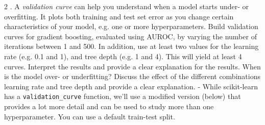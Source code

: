\documentclass[11pt]{article}
\begin{document}
    2 . A \emph{validation curve} can help you understand when a model
starts under- or overfitting. It plots both training and test set error
as you change certain characteristics of your model, e.g. one or more
hyperparameters. Build validation curves for gradient boosting,
evaluated using AUROC, by varying the number of iterations between 1 and
500. In addition, use at least two values for the learning rate (e.g.
0.1 and 1), and tree depth (e.g. 1 and 4). This will yield at least 4
curves. Interpret the results and provide a clear explanation for the
results. When is the model over- or underfitting? Discuss the effect of
the different combinations learning rate and tree depth and provide a
clear explanation. - While scikit-learn has a \texttt{validation\_curve}
function, we'll use a modified version (below) that provides a lot more
detail and can be used to study more than one hyperparameter. You can
use a default train-test split.
\end{document}
